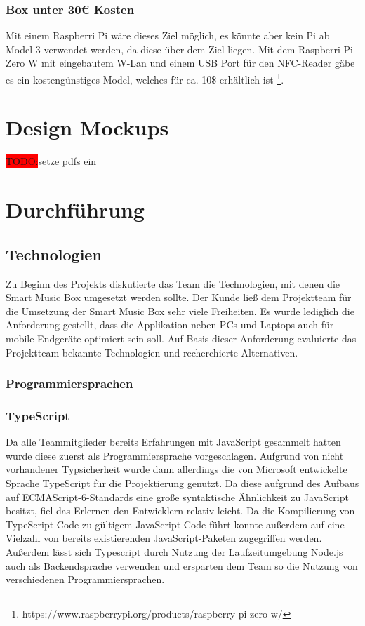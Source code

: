 \documentclass[10pt, a4paper, draft]{article}
\begin{document}
\subsubsection{Box unter 30€ Kosten}
Mit einem Raspberri Pi wäre dieses Ziel möglich, es könnte aber kein Pi ab Model 3 verwendet werden, da diese über dem Ziel liegen.
Mit dem Raspberri Pi Zero W mit eingebautem W-Lan und einem USB Port für den NFC-Reader gäbe es ein kostengünstiges Model, welches für ca. 10\$ erhältlich ist \footnote{https://www.raspberrypi.org/products/raspberry-pi-zero-w/}.

\section{Design Mockups}
\colorbox{red}{TODO:}setze pdfs ein

\section{Durchführung}

\subsection{Technologien}
Zu Beginn des Projekts diskutierte das Team die Technologien, mit denen die Smart Music Box umgesetzt werden sollte.
Der Kunde ließ dem Projektteam für die Umsetzung der Smart Music Box sehr viele Freiheiten.
Es wurde lediglich die Anforderung gestellt, dass die Applikation neben PCs und Laptops auch für mobile Endgeräte optimiert sein soll.
Auf Basis dieser Anforderung evaluierte das Projektteam bekannte Technologien und recherchierte Alternativen.

\subsubsection{Programmiersprachen}
\subsubsection*{TypeScript}
Da alle Teammitglieder bereits Erfahrungen mit JavaScript gesammelt hatten wurde diese zuerst als Programmiersprache vorgeschlagen.
Aufgrund von nicht vorhandener Typsicherheit wurde dann allerdings die von Microsoft entwickelte Sprache TypeScript für die Projektierung genutzt. Da diese aufgrund des
Aufbaus auf ECMAScript-6-Standards eine große syntaktische Ähnlichkeit zu JavaScript besitzt, fiel das Erlernen den Entwicklern relativ leicht.
Da die Kompilierung von TypeScript-Code zu gültigem JavaScript Code führt konnte außerdem auf eine Vielzahl von bereits existierenden JavaScript-Paketen zugegriffen werden.
Außerdem lässt sich Typescript durch Nutzung der Laufzeitumgebung Node.js auch als Backendsprache verwenden und ersparten dem Team so die Nutzung von verschiedenen Programmiersprachen.
\end{document}
